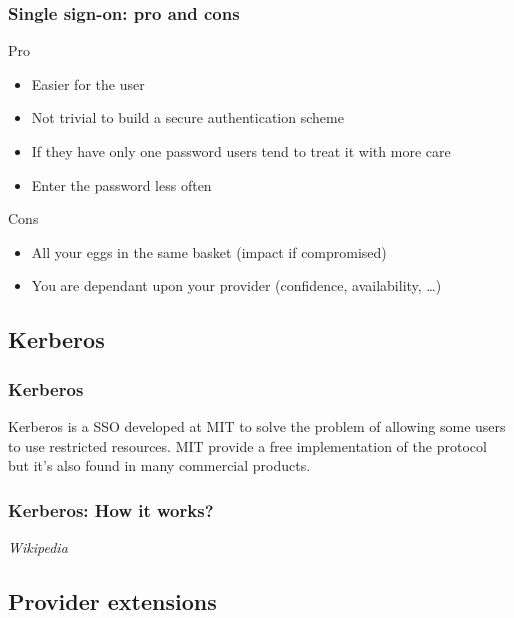 \begin{frame}
\frametitle{Single sign-on: pro and cons}

\begin{block}{Pro}
\begin{itemize}
\item Easier for the user
\item Not trivial to build a secure authentication scheme
\item If they have only one password users tend to treat it with more care
\item Enter the password less often
\end{itemize}
\end{block}

\begin{block}{Cons}
\begin{itemize}
\item All your eggs in the same basket (impact if compromised)
\item You are dependant upon your provider (confidence, availability, \ldots)
\end{itemize}
\end{block}

\end{frame}


\subsection{Kerberos}


\begin{frame}
\frametitle{Kerberos}

Kerberos is a SSO developed at MIT to solve the problem of allowing
some users to use restricted resources. MIT provide a free
implementation of the protocol but it's also found in many commercial
products.

\end{frame}


\begin{frame}
\frametitle{Kerberos: How it works?}
\textit{Wikipedia}
\end{frame}

\subsection{Provider extensions}

